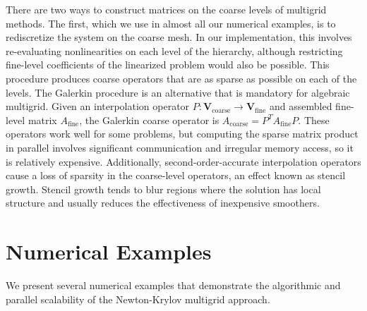 \documentclass[final]{siamltex}
\newcommand{\VV}{\bm V}
\begin{document}
There are two ways to construct matrices on the coarse levels of multigrid methods.
The first, which we use in almost all our numerical examples, is to rediscretize the system on the coarse mesh.
In our implementation, this involves re-evaluating nonlinearities on each level of the hierarchy, although restricting fine-level coefficients of the linearized problem would also be possible.
This procedure produces coarse operators that are as sparse as possible on each of the levels.
The Galerkin procedure is an alternative that is mandatory for algebraic multigrid.
Given an interpolation operator $P: \VV_{\text{coarse}} \to \VV_{\text{fine}}$ and assembled fine-level matrix $A_{\text{fine}}$, the Galerkin coarse operator is $A_{\text{coarse}} = P^T A_{\text{fine}} P$.
These operators work well for some problems, but computing the sparse matrix product in parallel involves significant communication and irregular memory access, so it is relatively expensive.
Additionally, second-order-accurate interpolation operators cause a loss of sparsity in the coarse-level operators, an effect known as stencil growth.
Stencil growth tends to blur regions where the solution has local structure and usually reduces the effectiveness of inexpensive smoothers.

\section{Numerical Examples}\label{sec:examples}

We present several numerical examples that demonstrate the algorithmic and parallel scalability of the Newton-Krylov multigrid approach.
\end{document}
